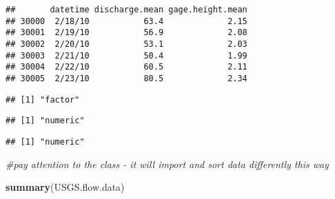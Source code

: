 \documentclass[]{article}
\newenvironment{Shaded}{\begin{snugshade}}{\end{snugshade}}
\newcommand{\KeywordTok}[1]{\textcolor[rgb]{0.13,0.29,0.53}{\textbf{#1}}}
\newcommand{\CommentTok}[1]{\textcolor[rgb]{0.56,0.35,0.01}{\textit{#1}}}
\newcommand{\OperatorTok}[1]{\textcolor[rgb]{0.81,0.36,0.00}{\textbf{#1}}}
\newcommand{\NormalTok}[1]{#1}
\begin{document}
\begin{verbatim}
##       datetime discharge.mean gage.height.mean
## 30000  2/18/10           63.4             2.15
## 30001  2/19/10           56.9             2.08
## 30002  2/20/10           53.1             2.03
## 30003  2/21/10           50.4             1.99
## 30004  2/22/10           60.5             2.11
## 30005  2/23/10           80.5             2.34
\end{verbatim}

\begin{Shaded}
\end{Shaded}

\begin{verbatim}
## [1] "factor"
\end{verbatim}

\begin{Shaded}
\end{Shaded}

\begin{verbatim}
## [1] "numeric"
\end{verbatim}

\begin{Shaded}
\end{Shaded}

\begin{verbatim}
## [1] "numeric"
\end{verbatim}

\begin{Shaded}
\begin{Highlighting}[]
\CommentTok{#pay attention to the class - it will import and sort data differently this way}

\KeywordTok{summary}\NormalTok{(USGS.flow.data)}
\end{Highlighting}
\end{Shaded}
\end{document}
